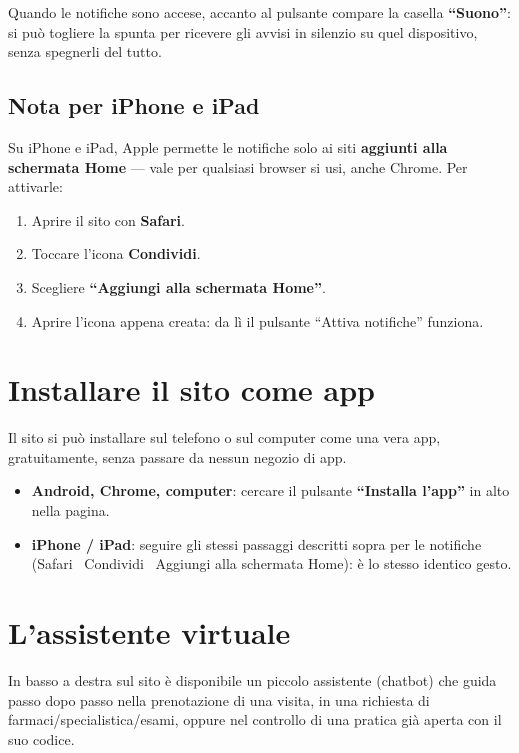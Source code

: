 \documentclass[11pt,a4paper]{article}
\newcommand{\bottone}[1]{\textbf{``#1''}}
\begin{document}
Quando le notifiche sono accese, accanto al pulsante compare la casella \bottone{Suono}: si può togliere la spunta per ricevere gli avvisi in silenzio su quel dispositivo, senza spegnerli del tutto.

\subsection*{Nota per iPhone e iPad}

Su iPhone e iPad, Apple permette le notifiche solo ai siti \textbf{aggiunti alla schermata Home} --- vale per qualsiasi browser si usi, anche Chrome. Per attivarle:
\begin{enumerate}
  \item Aprire il sito con \textbf{Safari}.
  \item Toccare l'icona \textbf{Condividi}.
  \item Scegliere \textbf{``Aggiungi alla schermata Home''}.
  \item Aprire l'icona appena creata: da lì il pulsante ``Attiva notifiche'' funziona.
\end{enumerate}

\section{Installare il sito come app}

Il sito si può installare sul telefono o sul computer come una vera app, gratuitamente, senza passare da nessun negozio di app.

\begin{itemize}
  \item \textbf{Android, Chrome, computer}: cercare il pulsante \bottone{Installa l'app} in alto nella pagina.
  \item \textbf{iPhone / iPad}: seguire gli stessi passaggi descritti sopra per le notifiche (Safari \textrightarrow\ Condividi \textrightarrow\ Aggiungi alla schermata Home): è lo stesso identico gesto.
\end{itemize}

\section{L'assistente virtuale}

In basso a destra sul sito è disponibile un piccolo assistente (chatbot) che guida passo dopo passo nella prenotazione di una visita, in una richiesta di farmaci/specialistica/esami, oppure nel controllo di una pratica già aperta con il suo codice.
\end{document}
